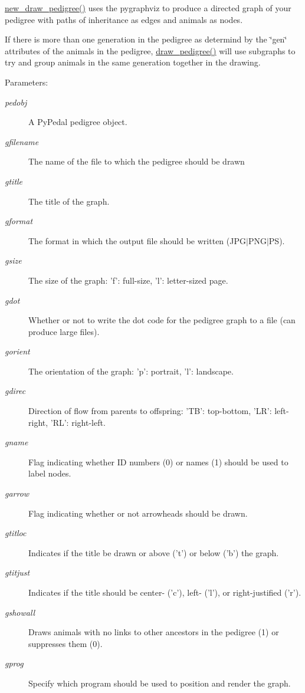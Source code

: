 \hyperlink{namespacePyPedal_1_1pyp__graphics_d1890710e78d0f63351d24e84527c570}{new\_\-draw\_\-pedigree()} uses the pygraphviz to produce a directed graph of your pedigree with paths of inheritance as edges and animals as nodes. 

If there is more than one generation in the pedigree as determind by the \char`\"{}gen\char`\"{} attributes of the animals in the pedigree, \hyperlink{namespacePyPedal_1_1pyp__graphics_60eaf4bd218e2b1f32385ce9e6b8e066}{draw\_\-pedigree()} will use subgraphs to try and group animals in the same generation together in the drawing. \begin{Desc}
\item[Parameters:]
\begin{description}
\item[{\em pedobj}]A Py\-Pedal pedigree object. \item[{\em gfilename}]The name of the file to which the pedigree should be drawn \item[{\em gtitle}]The title of the graph. \item[{\em gformat}]The format in which the output file should be written (JPG$|$PNG$|$PS). \item[{\em gsize}]The size of the graph: 'f': full-size, 'l': letter-sized page. \item[{\em gdot}]Whether or not to write the dot code for the pedigree graph to a file (can produce large files). \item[{\em gorient}]The orientation of the graph: 'p': portrait, 'l': landscape. \item[{\em gdirec}]Direction of flow from parents to offspring: 'TB': top-bottom, 'LR': left-right, 'RL': right-left. \item[{\em gname}]Flag indicating whether ID numbers (0) or names (1) should be used to label nodes. \item[{\em garrow}]Flag indicating whether or not arrowheads should be drawn. \item[{\em gtitloc}]Indicates if the title be drawn or above ('t') or below ('b') the graph. \item[{\em gtitjust}]Indicates if the title should be center- ('c'), left- ('l'), or right-justified ('r'). \item[{\em gshowall}]Draws animals with no links to other ancestors in the pedigree (1) or suppresses them (0). \item[{\em gprog}]Specify which program should be used to position and render the graph. \end{description}
\end{Desc}
